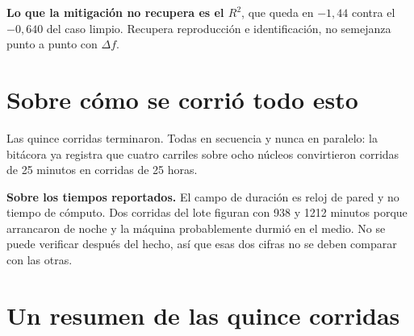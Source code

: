 \documentclass[11pt,a4paper]{article}
\begin{document}
\smallskip\par\textbf{Lo que la mitigación no recupera es el $R^2$}, que queda
en $-1{,}44$ contra el $-0{,}640$ del caso limpio. Recupera reproducción e
identificación, no semejanza punto a punto con $\Delta f$.

\section{Sobre cómo se corrió todo esto}

Las quince corridas terminaron. Todas en secuencia y nunca en paralelo: la
bitácora ya registra que cuatro carriles sobre ocho núcleos convirtieron
corridas de 25 minutos en corridas de 25 horas.

\smallskip\par\textbf{Sobre los tiempos reportados.} El campo de duración es
reloj de pared y no tiempo de cómputo. Dos corridas del lote figuran con 938 y
1212 minutos porque arrancaron de noche y la máquina probablemente durmió en el
medio. No se puede verificar después del hecho, así que esas dos cifras no se
deben comparar con las otras.

\section{Un resumen de las quince corridas}
\end{document}
